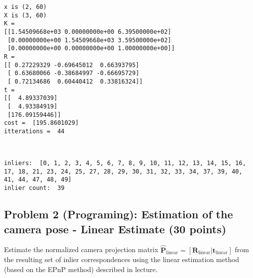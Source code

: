 \documentclass[11pt]{article}
\begin{document}
    \begin{Verbatim}[commandchars=\\\{\}]
x is (2, 60)
X is (3, 60)
K =
[[1.54509668e+03 0.00000000e+00 6.39500000e+02]
 [0.00000000e+00 1.54509668e+03 3.59500000e+02]
 [0.00000000e+00 0.00000000e+00 1.00000000e+00]]
R = 
[[ 0.27229329 -0.69645012  0.66393795]
 [ 0.63680066 -0.38684997 -0.66695729]
 [ 0.72134686  0.60440412  0.33816324]]
t = 
[[  4.89337039]
 [  4.93384919]
 [176.09159446]]
cost =  [195.8601029]
itterations =  44

    \end{Verbatim}

    \begin{center}
    \end{center}
    { \hspace*{\fill} \\}
    
    \begin{Verbatim}[commandchars=\\\{\}]
inliers:  [0, 1, 2, 3, 4, 5, 6, 7, 8, 9, 10, 11, 12, 13, 14, 15, 16, 17, 18, 21, 23, 24, 25, 27, 28, 29, 30, 31, 32, 33, 34, 37, 39, 40, 41, 44, 47, 48, 49]
inlier count:  39

    \end{Verbatim}

    \subsection{Problem 2 (Programing): Estimation of the camera pose -
Linear Estimate (30
points)}\label{problem-2-programing-estimation-of-the-camera-pose---linear-estimate-30-points}

Estimate the normalized camera projection matrix
\(\hat{\boldsymbol{P}}_\text{linear} = [\boldsymbol{R}_\text{linear} |  \boldsymbol{t}_\text{linear}]\)
from the resulting set of inlier correspondences using the linear
estimation method (based on the EPnP method) described in lecture.
\end{document}
